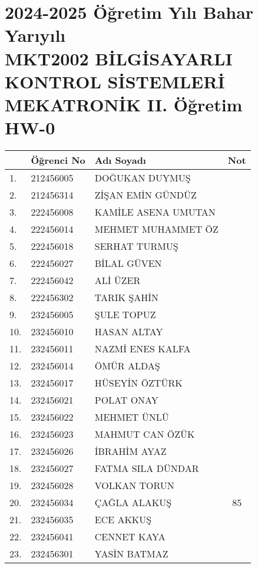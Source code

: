 \documentclass{article}
\begin{document}
\shorthandoff{=}
\section*{2024-2025 Öğretim Yılı Bahar Yarıyılı\\MKT2002 BİLGİSAYARLI KONTROL SİSTEMLERİ \\MEKATRONİK II. Öğretim\\HW-0}
\begin{tabular}{|l|l|l|c|}\hline
& \textbf{Öğrenci No}& \textbf{Adı Soyadı}& \textbf{Not}\\\hline
1.& 212456005& DOĞUKAN DUYMUŞ& \\\hline
2.& 212456314& ZİŞAN EMİN GÜNDÜZ& \\\hline
3.& 222456008& KAMİLE ASENA UMUTAN& \\\hline
4.& 222456014& MEHMET MUHAMMET ÖZ& \\\hline
5.& 222456018& SERHAT TURMUŞ& \\\hline
6.& 222456027& BİLAL GÜVEN& \\\hline
7.& 222456042& ALİ ÜZER& \\\hline
8.& 222456302& TARIK ŞAHİN& \\\hline
9.& 232456005& ŞULE TOPUZ& \\\hline
10.& 232456010& HASAN ALTAY& \\\hline
11.& 232456011& NAZMİ ENES KALFA& \\\hline
12.& 232456014& ÖMÜR ALDAŞ& \\\hline
13.& 232456017& HÜSEYİN ÖZTÜRK& \\\hline
14.& 232456021& POLAT ONAY& \\\hline
15.& 232456022& MEHMET ÜNLÜ& \\\hline
16.& 232456023& MAHMUT CAN ÖZÜK& \\\hline
17.& 232456026& İBRAHİM AYAZ& \\\hline
18.& 232456027& FATMA SILA DÜNDAR& \\\hline
19.& 232456028& VOLKAN TORUN& \\\hline
20.& 232456034& ÇAĞLA ALAKUŞ& 85\\\hline
21.& 232456035& ECE AKKUŞ& \\\hline
22.& 232456041& CENNET KAYA& \\\hline
23.& 232456301& YASİN BATMAZ& \\\hline
\end{tabular}
\end{document}
